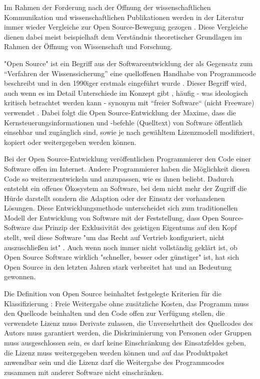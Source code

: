 Im Rahmen der Forderung nach der Öffnung der wissenschaftlichen Kommunikation und wissenschaftlichen Publikationen werden in der Literatur immer wieder Vergleiche zur Open Source-Bewegung gezogen  \cite{cite:9} \cite{Peters_2014} \cite{RIN_2010_open_research} \cite[:423]{mantz_2007_open} \cite{cite:1}. Diese Vergleiche dienen dabei meist beispielhaft dem Verständnis theoretischer Grundlagen im Rahmen der Öffnung von Wissenschaft und Forschung.

"Open Source" ist ein Begriff aus der Softwareentwicklung der als Gegensatz zum “Verfahren der Wissenssicherung” \cite{stallman2002} eine quelloffenen Handhabe von Programmcode beschreibt und in den 1990iger erstmals eingeführt wurde \cite[:5]{hippel_2003_open}. Dieser Begriff wird, auch wenn es im Detail Unterschiede im Konzept gibt \cite[:5]{hippel_2003_open}, häufig - was ideologisch kritisch betrachtet werden kann \cite{stallman2002} - synonym mit “freier Software“ (nicht Freeware) verwendet \cite{naeder_2010_open} \cite[:414]{mantz_2007_open}. Dabei folgt die Open Source-Entwicklung der Maxime, dass die Kernsteuerungsinformationen und -befehle (Quelltext) von Software öffentlich einsehbar und zugänglich sind, sowie je nach gewähltem Lizenzmodell modifiziert, kopiert oder weitergegeben werden können.

Bei der Open Source-Entwicklung veröffentlichen Programmierer den Code einer Software offen im Internet. Andere Programmierer haben die Möglichkeit diesen Code so weiterzuentwickeln und anzupassen, wie es ihnen beliebt. Dadurch entsteht ein offenes Ökosystem an Software, bei dem nicht mehr der Zugriff die Hürde darstellt sondern die Adaption oder der Einsatz der vorhandenen Lösungen. Diese Entwicklungsmethode unterscheidet sich zum traditionellen Modell der Entwicklung von Software mit der Feststellung, dass Open Source-Software das Prinzip der Exklusivität des geistigen Eigentums auf den Kopf stellt, weil diese Software "um das Recht auf Vertrieb konfiguriert, nicht auszuschließen ist" \cite{suchen}. Auch wenn noch immer nicht vollständig geklärt ist, ob Open Source Software wirklich "schneller, besser oder günstiger" ist, hat sich Open Source in den letzten Jahren stark verbreitet hat \cite{Lerner_2001} und an Bedeutung gewonnen.

Die Definition von Open Source beinhaltet festgelegte Kriterien für die Klassifizierung \cite{osd_2003}: Freie Weitergabe ohne zusätzliche Kosten, das Programm muss den Quellcode beinhalten und den Code offen zur Verfügung stellen, die verwendete Lizenz muss Derivate zulassen, die Unversehrtheit des Quellcodes des Autors muss garantiert werden, die Diskriminierung von Personen oder Gruppen muss ausgeschlossen sein, es darf keine Einschränkung des Einsatzfeldes geben, die Lizenz muss weitergegeben werden können und auf das Produktpaket anwendbar sein und die Lizenz darf die Weitergabe des Programmcodes zusammen mit anderer Software nicht einschränken.

